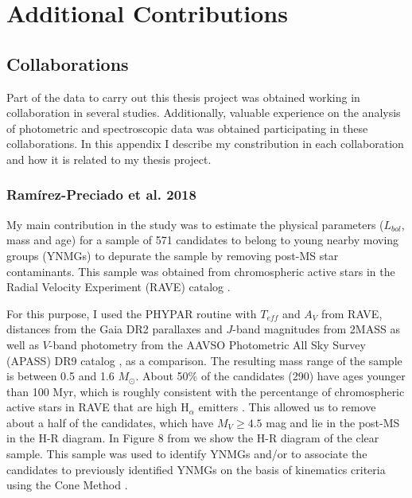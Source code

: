 \documentclass[12pt]{article}
\begin{document}
\appendix

\section{Additional Contributions}
\label{sec:constributions}

\subsection{Collaborations}
\label{sec:collaborations}
Part of the data to carry out this thesis project was obtained working in collaboration in several studies. Additionally, valuable experience on the analysis of photometric and spectroscopic data was obtained participating in these collaborations. In this appendix I describe my constribution in each collaboration and how it is related to my thesis project.

\subsubsection{Ram\'irez-Preciado et al. 2018}
\label{sec:Ramirez-Preciado}
My main contribution in the \cite{Ramirez-Preciado2018} study was to estimate the physical parameters ($L_{bol}$, mass and age) for a sample of 571 candidates to belong to young nearby moving groups (YNMGs) to depurate the sample by removing post-MS star contaminants. This sample was obtained from chromospheric active stars in the Radial Velocity Experiment (RAVE) catalog \citep{Kunder2017}.

For this purpose, I used the PHYPAR routine with $T_{eff}$ and $A_V$ from RAVE, distances from the Gaia DR2 parallaxes and $J$-band magnitudes from 2MASS as well as $V$-band photometry from the AAVSO Photometric All Sky Survey (APASS) DR9 catalog \citep{Henden2016}, as a comparison. The resulting mass range of the sample is between 0.5 and 1.6 $M_\odot$. About 50\% of the candidates (290) have ages younger than 100 Myr, which is roughly consistent with the percentange of chromospheric active stars in RAVE that are high H$_\alpha$ emitters \citep{Zerjal2013}. This allowed us to remove about a half of the candidates, which have $M_V\ge4.5$ mag and lie in the post-MS in the H-R diagram. In Figure 8 from \citet{Ramirez-Preciado2018} we show the H-R diagram of the clear sample. This sample was used to identify YNMGs and/or to associate the candidates to previously identified YNMGs on the basis of kinematics criteria using the Cone Method \citep{Ramirez-Preciado2018}.
\end{document}
